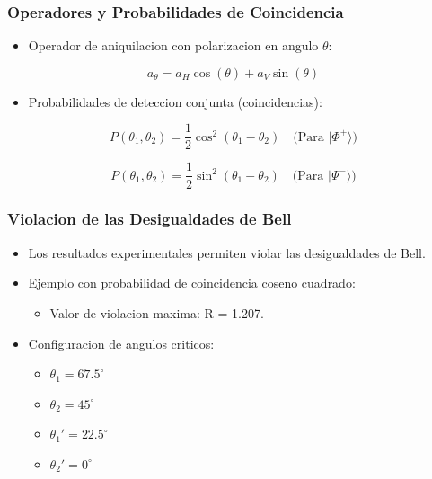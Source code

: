 \documentclass[article]{beamer}
\begin{document}
\begin{frame}
\frametitle{Operadores y Probabilidades de Coincidencia}

\begin{itemize}
    \item Operador de aniquilacion con polarizacion en angulo $\theta$:
\end{itemize}

\[
a_\theta = a_H \cos(\theta) + a_V \sin(\theta)
\]

\begin{itemize}
    \item Probabilidades de deteccion conjunta (coincidencias):
\end{itemize}

\[
P(\theta_1, \theta_2) = \frac{1}{2} \cos^2(\theta_1 - \theta_2) \quad \text{(Para } |\Phi^+\rangle\text{)}
\]

\[
P(\theta_1, \theta_2) = \frac{1}{2} \sin^2(\theta_1 - \theta_2) \quad \text{(Para } |\Psi^-\rangle\text{)}
\]

\end{frame}


\begin{frame}
\frametitle{Violacion de las Desigualdades de Bell}

\begin{itemize}
    \item Los resultados experimentales permiten violar las desigualdades de Bell.
    \item Ejemplo con probabilidad de coincidencia coseno cuadrado:
    \begin{itemize}
        \item Valor de violacion maxima: R = 1.207.
    \end{itemize}
    \item Configuracion de angulos criticos:
    \begin{itemize}
        \item $\theta_1 = 67.5^\circ$
        \item $\theta_2 = 45^\circ$
        \item $\theta_1' = 22.5^\circ$
        \item $\theta_2' = 0^\circ$
    \end{itemize}
\end{itemize}

\end{frame}
\end{document}
